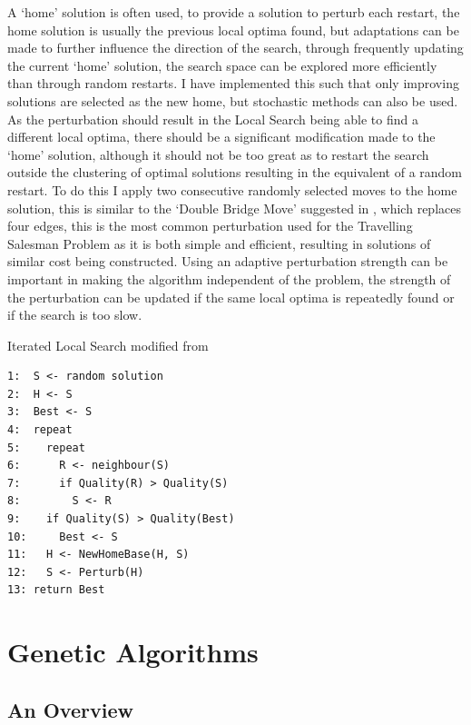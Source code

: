 \documentclass[]{final_report}
\begin{document}
A `home' solution is often used, to provide a solution to perturb each restart, the home solution is usually the previous local optima found, but adaptations can be made to further influence the direction of the search, through frequently updating the current `home' solution, the search space can be explored more efficiently than through random restarts\cite{luke:2013}. I have implemented this such that only improving solutions are selected as the new home, but stochastic methods can also be used. As the perturbation should result in the Local Search being able to find a different local optima, there should be a significant modification made to the `home' solution, although it should not be too great as to restart the search outside the clustering of optimal solutions resulting in the equivalent of a random restart\cite{luke:2013}. To do this I apply two consecutive randomly selected moves to the home solution, this is similar to the `Double Bridge Move' suggested in \cite{martin:2010}, which replaces four edges, this is the most common perturbation used for the Travelling Salesman Problem as it is both simple and efficient, resulting in solutions of similar cost being constructed. Using an adaptive perturbation strength can be important in making the algorithm independent of the problem, the strength of the perturbation can be updated if the same local optima is repeatedly found or if the search is too slow.

\newpage
Iterated Local Search modified from \cite{luke:2013}

\begin{verbatim}
1:  S <- random solution
2:  H <- S
3:  Best <- S
4:  repeat
5:    repeat
6:      R <- neighbour(S)
7:      if Quality(R) > Quality(S)
8:        S <- R
9:    if Quality(S) > Quality(Best)
10:     Best <- S
11:   H <- NewHomeBase(H, S)
12:   S <- Perturb(H)
13: return Best
\end{verbatim}

\newpage
\section*{Genetic Algorithms}

\subsection*{An Overview}
\end{document}
